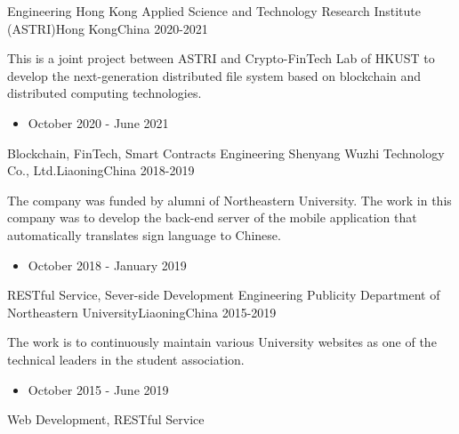 %
%
%
\begin{experiences}
  \experience
  {Engineering}   {Hong Kong Applied Science and Technology Research Institute (ASTRI)}{Hong Kong}{China}
  {2020-2021} {
    This is a joint project between ASTRI and Crypto-FinTech Lab of HKUST to develop the next-generation distributed file system based on blockchain and distributed computing technologies.
    \begin{itemize}
      \item October 2020 - June 2021
    \end{itemize}
  }
  {Blockchain, FinTech, Smart Contracts}
  \emptySeparator
  \experience
  {Engineering} {Shenyang Wuzhi Technology Co., Ltd.}{Liaoning}{China}
  {2018-2019}    {
    The company was funded by alumni of Northeastern University. The work in this company was to develop the back-end server of the mobile application that automatically translates sign language to Chinese.
    \begin{itemize}
      \item October 2018 - January 2019
    \end{itemize}
  }
  {RESTful Service, Sever-side Development}
  \emptySeparator
  \experience
  {Engineering} {Publicity Department of Northeastern University}{Liaoning}{China}
  {2015-2019}    {
    The work is to continuously maintain various University websites as one of the technical leaders in the student association.
    \begin{itemize}
      \item October 2015 - June 2019
    \end{itemize}
  }
  {Web Development, RESTful Service}
\end{experiences}
